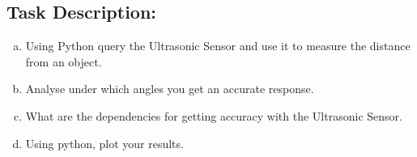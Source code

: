 

\subsection*{\Large Task Description:}
     \begin{enumerate}[a)]
        \item Using Python query the Ultrasonic Sensor and use it to measure the distance from an object. 
     
        \item Analyse under which angles you get an accurate response. 
        
        \item What are the dependencies for getting accuracy with the Ultrasonic Sensor.
        
        \item Using python, plot your results.
        
    \end{enumerate}
